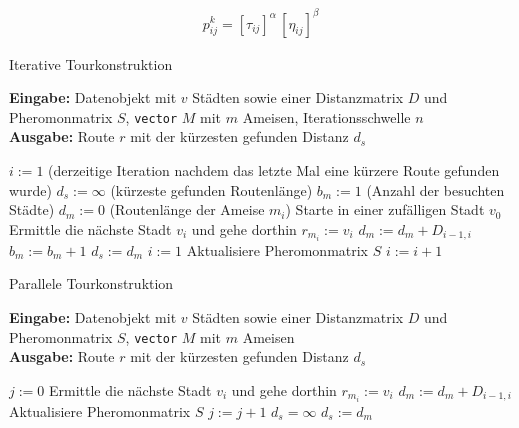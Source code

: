 \documentclass[doktyp=barbeit, sprache=german]{TUBAFarbeiten}
\begin{document}
\begin{align}
\label{eq:ProbSimple}
p^k_{ij} = [\tau_{ij}]^\alpha \, [\eta_{ij}]^\beta
\end{align}
\begin{algorithm}
\caption{Iterative Tourkonstruktion}
\label{IterativeTour}
\textbf{Eingabe:} Datenobjekt mit $v$ Städten sowie einer Distanzmatrix $D$ und Pheromonmatrix $S$, \texttt{vector} $M$ mit $m$ Ameisen, Iterationsschwelle $n$
\\\textbf{Ausgabe:} Route $r$ mit der kürzesten gefunden Distanz $d_s$
\begin{algorithmic}[1]
\State $i := 1$ (derzeitige Iteration nachdem das letzte Mal eine kürzere Route gefunden wurde)
\State $d_s := \infty$ (kürzeste gefunden Routenlänge)
\State $b_m := 1$ (Anzahl der besuchten Städte)
\State $d_m := 0$ (Routenlänge der Ameise $m_i$)
\State Starte in einer zufälligen Stadt $v_0$
\State Ermittle die nächste Stadt $v_i$ und gehe dorthin
\State $r_{m_i} := v_i$
\State $d_m := d_m + D_{i-1,i}$
\State $b_m := b_m + 1$
\EndWhile
{}
\State $d_s := d_m$
\State $i := 1$
\EndIf
\State Aktualisiere Pheromonmatrix $S$
\State $i := i + 1$
\EndIf
\EndFor
\end{algorithmic}
\end{algorithm}
\begin{algorithm}
\caption{Parallele Tourkonstruktion}
\label{ParallelTour}
\textbf{Eingabe:} Datenobjekt mit $v$ Städten sowie einer Distanzmatrix $D$ und Pheromonmatrix $S$, \texttt{vector} $M$ mit $m$ Ameisen
\\\textbf{Ausgabe:} Route $r$ mit der kürzesten gefunden Distanz $d_s$
\begin{algorithmic}[1]
\State $j := 0$
\State Ermittle die nächste Stadt $v_i$ und gehe dorthin
\State $r_{m_i} := v_i$
\State $d_m := d_m + D_{i-1,i}$
\State Aktualisiere Pheromonmatrix $S$
\EndFor
\State $j := j + 1$
\EndWhile
\State $d_s = \infty$
\State $d_s := d_m$
\EndIf
\EndFor
\end{algorithmic}
\end{algorithm}
\end{document}
